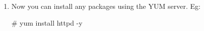 \begin{flushleft}
\begin{enumerate}
		\item Now you can install any packages using the YUM server.
		\newline
		Eg:
		\begin{tcolorbox}[breakable,notitle,boxrule=-0pt,colback=black,colframe=black]
			\color{green}
			\font=9pt
			\# yum	install	httpd -y		
			\font=4pt
		\end{tcolorbox}
		

		
		
		
	\end{enumerate}

	

\end{flushleft}
\newpage



